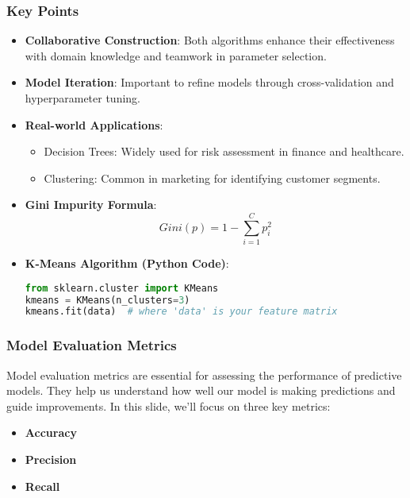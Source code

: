 \documentclass[aspectratio=169]{beamer}
\begin{document}
\begin{frame}
    \frametitle{Key Points}
    \begin{itemize}
        \item \textbf{Collaborative Construction}: Both algorithms enhance their effectiveness with domain knowledge and teamwork in parameter selection.
        \item \textbf{Model Iteration}: Important to refine models through cross-validation and hyperparameter tuning.
        \item \textbf{Real-world Applications}:
            \begin{itemize}
                \item Decision Trees: Widely used for risk assessment in finance and healthcare.
                \item Clustering: Common in marketing for identifying customer segments.
            \end{itemize}
        \item \textbf{Gini Impurity Formula}:
            \begin{equation}
                Gini(p) = 1 - \sum_{i=1}^{C} p_i^2
            \end{equation}
        \item \textbf{K-Means Algorithm (Python Code)}:
            \begin{lstlisting}[language=Python]
from sklearn.cluster import KMeans
kmeans = KMeans(n_clusters=3)
kmeans.fit(data)  # where 'data' is your feature matrix
            \end{lstlisting}
    \end{itemize}
\end{frame}

\begin{frame}[fragile]
  \frametitle{Model Evaluation Metrics}
  Model evaluation metrics are essential for assessing the performance of predictive models.
  They help us understand how well our model is making predictions and guide improvements.
  In this slide, we'll focus on three key metrics: 
  \begin{itemize}
      \item \textbf{Accuracy}
      \item \textbf{Precision}
      \item \textbf{Recall}
  \end{itemize}
\end{frame}
\end{document}
